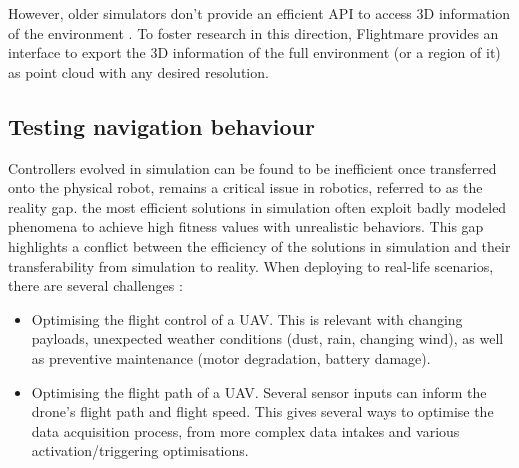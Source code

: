 However, older simulators don’t provide an efficient API to access 3D information of the environment \cite{flightmare}. To foster research in this direction, Flightmare provides an interface to export the 3D information of the full environment (or a region of it) as point cloud with any desired resolution.

\subsection{Testing navigation behaviour}

Controllers evolved in simulation can be found to be inefficient once transferred onto the physical robot, remains a critical issue in robotics, referred to as the reality gap. the most efficient solutions in simulation often exploit badly modeled phenomena to achieve high fitness values with unrealistic behaviors. This gap highlights a conﬂict between the efficiency of the solutions in simulation and their transferability from simulation to reality. When deploying to real-life scenarios, there are several challenges \cite{drl_review}:

\begin{itemize}
    \item Optimising the flight control of a UAV. This is relevant with changing payloads, unexpected weather conditions (dust, rain, changing wind), as well as preventive maintenance (motor degradation, battery damage).



    \item Optimising the flight path of a UAV. Several sensor inputs can inform the drone’s flight path and flight speed. This gives several ways to optimise the data acquisition process, from more complex data intakes and various activation/triggering optimisations.
 

\end{itemize}


